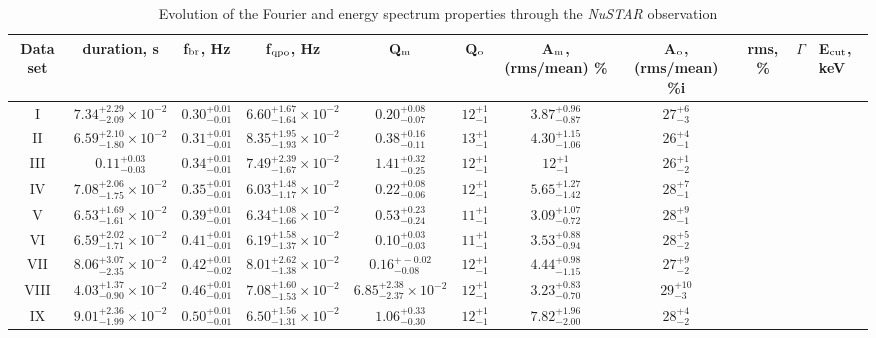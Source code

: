 \documentclass[a4paper,fleqn,usenatbib]{mnras}
\begin{document}
\begin{table}
\noindent
\centering
\caption{Evolution of the Fourier and energy spectrum properties through the {\it NuSTAR} observation}
\label{tab:timing}
\begin{tabular}{|c|c|c|c|c|c|c|c|c|c|}
\hline\hline
Data set & duration, s & f$_{\rm br}$, Hz & f$_{\rm qpo}$, Hz & Q$_{\rm m}$ & Q$_{\rm o}$ & A$_{\rm m}$, (rms/mean) \% & A$_{\rm o}$, (rms/mean) \%i & rms, \% & $\Gamma$ & E$_{\rm cut}$, keV \\
\hline

I & $7.34_{-2.09}^{+2.29}\times10^{-2}$ & $0.30_{-0.01}^{+0.01}$ & $6.60_{-1.64}^{+1.67}\times10^{-2}$ & $0.20_{-0.07}^{+0.08}$ & $12_{-1}^{+1}$ & $3.87_{-0.87}^{+0.96}$ & $27_{-3}^{+6}$ & & \\
II & $6.59_{-1.80}^{+2.10}\times10^{-2}$ & $0.31_{-0.01}^{+0.01}$ & $8.35_{-1.93}^{+1.95}\times10^{-2}$ & $0.38_{-0.11}^{+0.16}$ & $13_{-1}^{+1}$ & $4.30_{-1.06}^{+1.15}$ & $26_{-1}^{+4}$ & & \\
III & $0.11_{-0.03}^{+0.03}$ & $0.34_{-0.01}^{+0.01}$ & $7.49_{-1.67}^{+2.39}\times10^{-2}$ & $1.41_{-0.25}^{+0.32}$ & $12_{-1}^{+1}$ & $12_{-1}^{+1}$ & $26_{-2}^{+1}$ & & \\
IV & $7.08_{-1.75}^{+2.06}\times10^{-2}$ & $0.35_{-0.01}^{+0.01}$ & $6.03_{-1.17}^{+1.48}\times10^{-2}$ & $0.22_{-0.06}^{+0.08}$ & $12_{-1}^{+1}$ & $5.65_{-1.42}^{+1.27}$ & $28_{-1}^{+7}$ & & \\
V & $6.53_{-1.61}^{+1.69}\times10^{-2}$ & $0.39_{-0.01}^{+0.01}$ & $6.34_{-1.66}^{+1.08}\times10^{-2}$ & $0.53_{-0.24}^{+0.23}$ & $11_{-1}^{+1}$ & $3.09_{-0.72}^{+1.07}$ & $28_{-1}^{+9}$ & & \\
VI & $6.59_{-1.71}^{+2.02}\times10^{-2}$ & $0.41_{-0.01}^{+0.01}$ & $6.19_{-1.37}^{+1.58}\times10^{-2}$ & $0.10_{-0.03}^{+0.03}$ & $11_{-1}^{+1}$ & $3.53_{-0.94}^{+0.88}$ & $28_{-2}^{+5}$ & & \\
VII & $8.06_{-2.35}^{+3.07}\times10^{-2}$ & $0.42_{-0.02}^{+0.01}$ & $8.01_{-1.38}^{+2.62}\times10^{-2}$ & $0.16_{-0.08}^{+-0.02}$ & $12_{-1}^{+1}$ & $4.44_{-1.15}^{+0.98}$ & $27_{-2}^{+9}$ & & \\
VIII & $4.03_{-0.90}^{+1.37}\times10^{-2}$ & $0.46_{-0.01}^{+0.01}$ & $7.08_{-1.53}^{+1.60}\times10^{-2}$ & $6.85_{-2.37}^{+2.38}\times10^{-2}$ & $12_{-1}^{+1}$ & $3.23_{-0.70}^{+0.83}$ & $29_{-3}^{+10}$ & & \\
IX & $9.01_{-1.99}^{+2.36}\times10^{-2}$ & $0.50_{-0.01}^{+0.01}$ & $6.50_{-1.31}^{+1.56}\times10^{-2}$ & $1.06_{-0.30}^{+0.33}$ & $12_{-1}^{+1}$ & $7.82_{-2.00}^{+1.96}$ & $28_{-2}^{+4}$ & & \\

\end{tabular}
\end{table}
\end{document}
